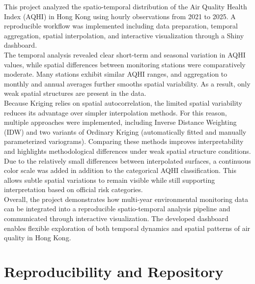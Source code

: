 \documentclass[manuscript,nonacm]{acmart}
\begin{document}
This project analyzed the spatio-temporal distribution of the Air Quality Health Index (AQHI) in Hong Kong using hourly observations from 2021 to 2025. A reproducible workflow was implemented including data preparation, temporal aggregation, spatial interpolation, and interactive visualization through a Shiny dashboard.\\
The temporal analysis revealed clear short-term and seasonal variation in AQHI values, while spatial differences between monitoring stations were comparatively moderate. Many stations exhibit similar AQHI ranges, and aggregation to monthly and annual averages further smooths spatial variability. As a result, only weak spatial structures are present in the data.\\
Because Kriging relies on spatial autocorrelation, the limited spatial variability reduces its advantage over simpler interpolation methods. For this reason, multiple approaches were implemented, including Inverse Distance Weighting (IDW) and two variants of Ordinary Kriging (automatically fitted and manually parameterized variograms). Comparing these methods improves interpretability and highlights methodological differences under weak spatial structure conditions.\\
Due to the relatively small differences between interpolated surfaces, a continuous color scale was added in addition to the categorical AQHI classification. This allows subtle spatial variations to remain visible while still supporting interpretation based on official risk categories.\\
Overall, the project demonstrates how multi-year environmental monitoring data can be integrated into a reproducible spatio-temporal analysis pipeline and communicated through interactive visualization. The developed dashboard enables flexible exploration of both temporal dynamics and spatial patterns of air quality in Hong Kong.


\section{Reproducibility and Repository}
\end{document}
